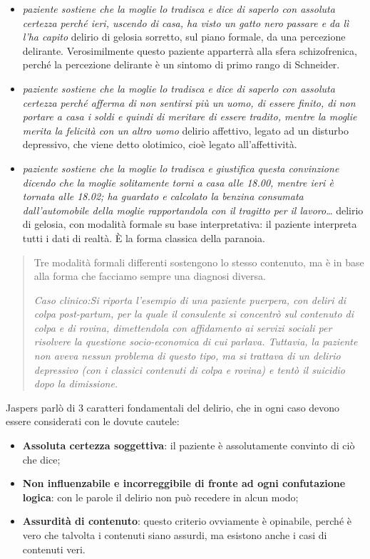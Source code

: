\documentclass[]{article}
\begin{document}
\begin{itemize}
\item
  \emph{paziente sostiene che la moglie lo tradisca e dice di saperlo
  con assoluta certezza perché ieri, uscendo di casa, ha visto un gatto
  nero passare e da lì l'ha capito} delirio di gelosia sorretto, sul
  piano formale, da una percezione delirante. Verosimilmente questo
  paziente apparterrà alla sfera schizofrenica, perché la percezione
  delirante è un sintomo di primo rango di Schneider.
\item
  \emph{paziente sostiene che la moglie lo tradisca e dice di saperlo
  con assoluta certezza perché afferma di non sentirsi più un uomo, di
  essere finito, di non portare a casa i soldi e quindi di meritare di
  essere tradito, mentre la moglie merita la felicità con un altro uomo}
  delirio affettivo, legato ad un disturbo depressivo, che viene detto
  olotimico, cioè legato all'affettività.
\item
  \emph{paziente sostiene che la moglie lo tradisca e giustifica questa
  convinzione dicendo che la moglie solitamente torni a casa alle 18.00,
  mentre ieri è tornata alle 18.02; ha guardato e calcolato la benzina
  consumata dall'automobile della moglie rapportandola con il tragitto
  per il lavoro}\ldots{} delirio di gelosia, con modalità formale su
  base interpretativa: il paziente interpreta tutti i dati di realtà. È
  la forma classica della paranoia.
\end{itemize}

\begin{quote}
Tre modalità formali differenti sostengono lo stesso contenuto, ma è in
base alla forma che facciamo sempre una diagnosi diversa.

\emph{Caso clinico:Si riporta l'esempio di una} \emph{paziente puerpera,
con deliri di colpa post-partum, per la quale il consulente si concentrò
sul contenuto di colpa e di rovina, dimettendola con affidamento ai
servizi sociali per risolvere la questione socio-economica di cui
parlava. Tuttavia, la paziente non aveva nessun problema di questo tipo,
ma si trattava di un delirio depressivo (con i classici contenuti di
colpa e rovina) e tentò il suicidio dopo la dimissione. }
\end{quote}

Jaspers parlò di 3 caratteri fondamentali del delirio, che in ogni caso
devono essere considerati con le dovute cautele:

\begin{itemize}
\item
  \textbf{Assoluta certezza soggettiva}: il paziente è assolutamente
  convinto di ciò che dice;
\item
  \textbf{Non influenzabile e incorreggibile di fronte ad ogni
  confutazione logica}: con le parole il delirio non può recedere in
  alcun modo;
\item
  \textbf{Assurdità di contenuto}: questo criterio ovviamente è
  opinabile, perché è vero che talvolta i contenuti siano assurdi, ma
  esistono anche i casi di contenuti veri.
\end{itemize}
\end{document}
